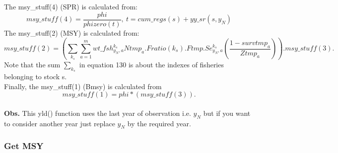 \documentclass{article}
\begin{document}
The msy\_stuff(4) (SPR) is calculated from:
\begin{equation}
    msy\_stuff(4)=\dfrac{phi}{phizero(t)}, \ t=cum\_regs(s)+yy\_sr(s,y_N)
\end{equation}
The msy\_stuff(2) (MSY) is calculated from:
\begin{equation}
    msy\_stuff(2)=\left(\sum_{k_s}\sum_{a=1}^m wt\_fsh^{k_s}_{y_N,a}Ntmp_a.Fratio(k_s).Ftmp.Se^{k_s}_{y_N,a}\left(\dfrac{1-survtmp_a}{Ztmp_a}\right)\right).msy\_stuff(3).
\end{equation}
Note that the sum $\displaystyle\sum_{k_s}$ in equation 130 is about the indexes of fisheries belonging to stock s.\\
Finally, the msy\_stuff(1) (Bmsy) is calculated from
\begin{equation}
    msy\_stuff(1)=phi*(msy\_stuff(3)).
\end{equation}
\\
\textbf{Obs.} This yld() function uses the last year of observation i.e. $y_N$ but if you want to consider another year just replace $y_N$ by the required year.

\subsubsection{Get MSY}
\end{document}
